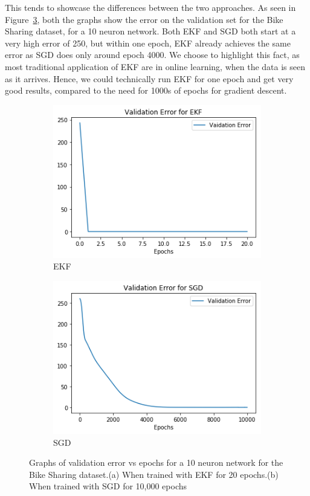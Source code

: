 \documentclass{article}
\begin{document}
This tends to showcase the differences between the two approaches. As seen in Figure~\ref{fig:validation}, both the graphs show the error on the validation set for the Bike Sharing dataset, for a 10 neuron network. Both EKF and SGD both start at a very high error of 250, but within one epoch, EKF already achieves the same error as SGD does only around epoch 4000. We choose to highlight this fact, as most traditional application of EKF are in online learning, when the data is seen as it arrives. Hence, we could technically run EKF for one epoch and get very good results, compared to the need for 1000s of epochs for gradient descent.  
\begin{figure}[h!]
    \centering
    \begin{subfigure}[b]{0.45\linewidth}
        \includegraphics[width=\linewidth]{EKF_validation.png}
        \caption{EKF}
        \label{fig:ekf-validation}
    \end{subfigure}
    \begin{subfigure}[b]{0.45\linewidth}
        \includegraphics[width=\linewidth]{SGD_validation.png}
        \caption{SGD}
        \label{fig:sgd-validation}
    \end{subfigure}
    \caption{Graphs of validation error vs epochs for a 10 neuron network for the Bike Sharing dataset.(a) When trained with EKF for 20 epochs.(b) When trained with SGD for 10,000 epochs}
    \label{fig:validation}
\end{figure}
\end{document}
